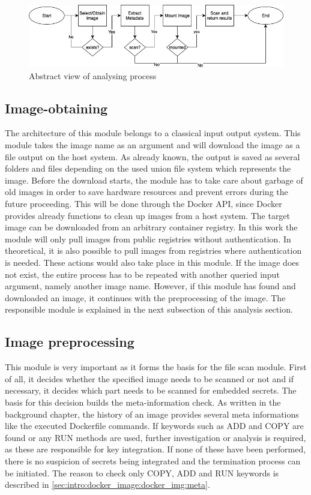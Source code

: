 \begin{figure}[htbp]
\centering
\includegraphics[width=1.0\textwidth]{gfx/examples/basic_workflow_scan}
\caption{Abstract view of analysing process}
\label{ch:theory:analysing process:fig}
\end{figure}

\subsection{Image-obtaining}
\label{ch:theory:analysing_process:obtain}
The architecture of this module belongs to a classical input output system. This module takes the image name as an argument and will download the image as a file output on the host system. As already known, the output is saved as several folders and files depending on the used union file system which represents the image. Before the download starts, the module has to take care about garbage of old images in order to save hardware resources and prevent errors during the future proceeding. This will be done through the Docker API, since Docker provides already functions to clean up images from a host system.
The target image can be downloaded from an arbitrary container registry. In this work the module will only pull images from public registries without authentication. In theoretical, it is also possible to pull images from registries where authentication is needed. These actions would also take place in this module.
If the image does not exist, the entire process has to be repeated with another queried input argument, namely another image name.
However, if this module has found and downloaded an image, it continues with the preprocessing of the image. The responsible module is explained in the next subsection of this analysis section.

\subsection{Image preprocessing}
\label{ch:theory:analysing_process:prepro}
This module is very important as it forms the basis for the file scan module. First of all, it decides whether the specified image needs to be scanned or not and if necessary, it decides which part needs to be scanned for embedded secrets. The basis for this decision builds the meta-information check. As written in the background chapter, the history of an image provides several meta informations like the executed Dockerfile commands.
If keywords such as ADD and COPY are found or any RUN methods are used, further investigation or analysis is required, as these are responsible for key integration. If none of these have been performed, there is no suspicion of secrets being integrated and the termination process can be initiated.
The reason to check only COPY, ADD and RUN keywords is described in \ref{sec:intro:docker_image:docker_img:meta}. 


